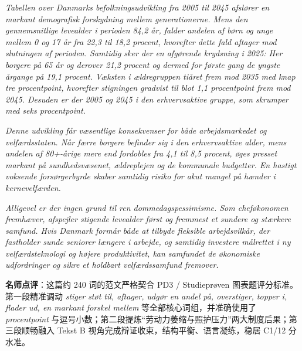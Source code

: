 \begin{answerbox}
\textit{Tabellen over Danmarks befolkningsudvikling fra 2005 til 2045 afslører en markant demografisk forskydning mellem generationerne. Mens den gennemsnitlige levealder i perioden  84,2 år, falder andelen af børn og unge mellem 0 og 17 år fra 22,3 til 18,2 procent, hvorefter dette fald aftager mod slutningen af perioden. Samtidig sker der en afgørende krydsning i 2025: Her  borgere på 65 år og derover  21,2 procent og  dermed for første gang de yngste årgange på 19,1 procent. Væksten i ældregruppen  tiåret frem mod 2035 med knap tre procentpoint, hvorefter stigningen gradvist  til blot 1,1 procentpoint frem mod 2045. Desuden er der  2005 og 2045 i den erhvervsaktive gruppe, som skrumper med seks procentpoint.}

\textit{Denne udvikling får væsentlige konsekvenser for både arbejdsmarkedet og velfærdsstaten. Når færre borgere befinder sig i den erhvervsaktive alder, mens andelen af 80+-årige mere end fordobles fra 4,1 til 8,5 procent, øges presset markant på sundhedsvæsenet, ældreplejen og de kommunale budgetter. En hastigt voksende forsørgerbyrde skaber samtidig risiko for akut mangel på hænder i kernevelfærden.}

\textit{Alligevel er der ingen grund til ren dommedagspessimisme. Som cheføkonomen fremhæver, afspejler stigende levealder først og fremmest et sundere og stærkere samfund. Hvis Danmark formår både at tilbyde fleksible arbejdsvilkår, der fastholder sunde seniorer længere i arbejde, og samtidig investere målrettet i ny velfærdsteknologi og højere produktivitet, kan samfundet  de økonomiske udfordringer og sikre et holdbart velfærdssamfund fremover.}

\small\textbf{名师点评}：这篇约 240 词的范文严格契合 PD3 / Studieprøven 图表题评分标准。第一段精准调动 \textit{stiger støt til, aftager, udgør en andel på, overstiger, topper i, flader ud, en markant forskel mellem} 等全部核心词组，并准确使用了 \textit{procentpoint} 与逗号小数；第二段提炼“劳动力萎缩与照护压力”两大制度后果；第三段顺畅融入 Tekst B 视角完成辩证收束，结构平衡、语言凝练，稳居 C1/12 分水准。
\end{answerbox}
